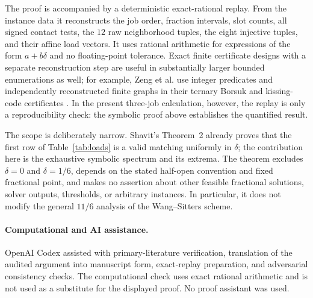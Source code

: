 \documentclass[11pt]{article}
\begin{document}
The proof is accompanied by a deterministic exact-rational replay.  From the
instance data it reconstructs the job order, fraction intervals, slot counts,
all signed contact tests, the $12$ raw neighborhood tuples, the eight injective
tuples, and their affine load vectors.  It uses rational arithmetic for
expressions of the form $a+b\delta$ and no floating-point tolerance.  Exact
finite certificate designs with a separate reconstruction step are useful in
substantially larger bounded enumerations as well; for example, Zeng et al.
use integer predicates and independently reconstructed finite graphs in their
ternary Borsuk and kissing-code certificates \cite{ZengEtAl2026}.  In the
present three-job calculation, however, the replay is only a reproducibility
check: the symbolic proof above establishes the quantified result.

The scope is deliberately narrow.  Shavit's Theorem~2 already proves that the
first row of Table~\ref{tab:loads} is a valid matching uniformly in $\delta$;
the contribution here is the exhaustive symbolic spectrum and its extrema.
The theorem excludes $\delta=0$ and $\delta=1/6$, depends on the stated
half-open convention and fixed fractional point, and makes no assertion about
other feasible fractional solutions, solver outputs, thresholds, or arbitrary
instances.  In particular, it does not modify the general $11/6$ analysis of
the Wang--Sitters scheme.

\paragraph{Computational and AI assistance.}
OpenAI Codex assisted with primary-literature verification, translation of the
audited argument into manuscript form, exact-replay preparation, and
adversarial consistency checks.  The computational check uses exact rational
arithmetic and is not used as a substitute for the displayed proof.  No proof
assistant was used.

{\small


}
\end{document}
